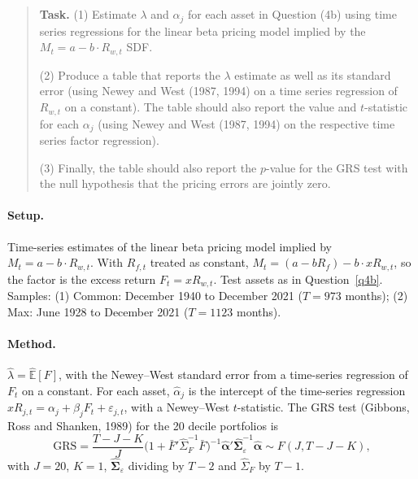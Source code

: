 \documentclass[11pt]{article}
\newcommand{\task}[1]{\begin{quote}\small\textbf{Task.} #1\end{quote}}
\begin{document}
\FloatBarrier
\subsection{}\label{q4d}
\task{(1) Estimate $\lambda$ and $\alpha_j$ for each asset in Question (4b) using time series regressions for the linear beta pricing model implied by the $M_t = a - b \cdot R_{w,t}$ SDF.\par (2) Produce a table that reports the $\lambda$ estimate as well as its standard error (using Newey and West (1987, 1994) on a time series regression of $R_{w,t}$ on a constant). The table should also report the value and $t$-statistic for each $\alpha_j$ (using Newey and West (1987, 1994) on the respective time series factor regression).\par (3) Finally, the table should also report the $p$-value for the GRS test with the null hypothesis that the pricing errors are jointly zero.}
\paragraph{Setup.}
Time-series estimates of the linear beta pricing model implied by $M_t = a - b \cdot R_{w,t}$. With
$R_{f,t}$ treated as constant, $M_t = (a - b R_f) - b \cdot xR_{w,t}$, so the factor is the excess return
$F_t = xR_{w,t}$. Test assets as in Question~\ref{q4b}. Samples: (1) Common: December 1940 to December 2021 ($T = 973$ months); (2) Max: June 1928 to December 2021 ($T = 1123$ months).

\paragraph{Method.}
$\hat{\lambda} = \widehat{\mathbb{E}}[F]$, with the Newey--West standard error from a time-series regression
of $F_t$ on a constant. For each asset, $\hat{\alpha}_j$ is the intercept of the time-series regression
$xR_{j,t} = \alpha_j + \beta_j F_t + \varepsilon_{j,t}$, with a Newey--West $t$-statistic. The GRS test
(Gibbons, Ross and Shanken, 1989) for the 20 decile portfolios is
\[
  \mathrm{GRS} = \frac{T-J-K}{J}\big(1 + \bar{F}'\hat{\Sigma}_F^{-1}\bar{F}\big)^{-1}
  \hat{\bm{\alpha}}'\hat{\bm{\Sigma}}_\varepsilon^{-1}\hat{\bm{\alpha}} \sim F(J, T-J-K),
\]
with $J = 20$, $K = 1$, $\hat{\bm{\Sigma}}_\varepsilon$ dividing by $T - 2$ and $\hat{\Sigma}_F$ by $T - 1$.
\end{document}
